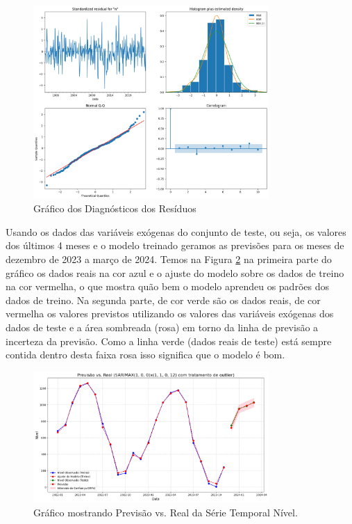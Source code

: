 \documentclass[ 12pt,a4paper ]{article} %
\begin{document}
	\begin{figure}[h!]
		\centering %
		\includegraphics[width=0.8\textwidth]{residuos.png} %
		\caption{Gráfico dos Diagnósticos dos Resíduos} %
		\label{fig5} %
	\end{figure}
	
	Usando os dados das variáveis exógenas do conjunto de teste, ou seja, os valores dos últimos 4 meses e o modelo treinado geramos as previsões para os meses de dezembro de 2023 a março de 2024. Temos na Figura \ref{fig4} na primeira parte do gráfico os dados reais na cor azul e o ajuste do modelo sobre os dados de treino na cor vermelha, o que mostra quão bem o modelo aprendeu os padrões dos dados de treino. Na segunda parte, de cor verde são os dados reais, de cor vermelha os valores previstos utilizando os valores das variáveis exógenas dos dados de teste e a área sombreada (rosa) em torno da linha de previsão a incerteza da previsão. Como a linha verde (dados reais de teste) está sempre contida dentro desta faixa rosa isso significa que o modelo é bom.
	\begin{figure}[h!]
		\centering %
		\includegraphics[width=0.8\textwidth]{previsao.png} %
		\caption{Gráfico mostrando Previsão vs. Real da Série Temporal Nível.} %
		\label{fig4} %
	\end{figure}
	
\end{document}
